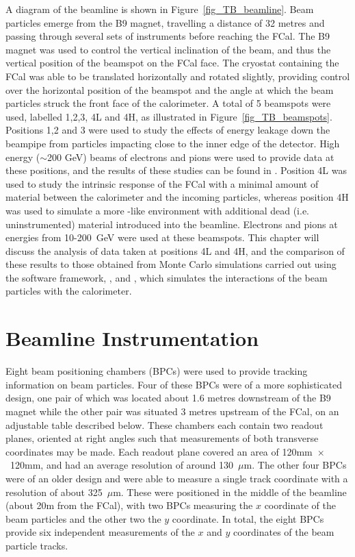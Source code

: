A diagram of the beamline is shown in Figure~\ref{fig_TB_beamline}. Beam particles emerge from the B9 magnet, travelling a distance of 32 metres and passing through several sets of instruments before reaching the FCal. The B9 magnet was used to control the vertical inclination of the beam, and thus the vertical position of the beamspot on the FCal face. The cryostat containing the FCal was able to be translated horizontally and rotated slightly, providing control over the horizontal position of the beamspot and the angle at which the beam particles struck the front face of the calorimeter. A total of 5 beamspots were used, labelled 1,2,3, 4L and 4H, as illustrated in Figure~\ref{fig_TB_beamspots}. Positions 1,2 and 3 were used to study the effects of energy leakage down the beampipe from particles impacting close to the inner edge of the detector. High energy ($\sim$200 GeV) beams of electrons and pions were used to provide data at these positions, and the results of these studies can be found in \cite{LouiseThesis,TB03_tbp}. Position 4L was used to study the intrinsic response of the FCal with a minimal amount of material between the calorimeter and the incoming particles, whereas position 4H was used to simulate a more \atlas-like environment with additional dead (i.e. uninstrumented) material introduced into the beamline. Electrons and pions at energies from 10-200~GeV were used at these beamspots. This chapter will discuss the analysis of data taken at positions 4L and 4H, and the comparison of these results to those obtained from Monte Carlo simulations carried out using the \atlas software framework, \athena, and \geant, which simulates the interactions of the beam particles with the calorimeter.
 



\section{Beamline Instrumentation}
\label{sec_TBoverview_beamline}
Eight beam positioning chambers (BPCs) were used to provide tracking information on beam particles.
Four of these BPCs were of a more sophisticated design, one pair of which was located about 1.6 metres downstream of the B9 magnet while the other pair was situated 3 metres upstream of the FCal, on an adjustable table described below. These chambers each contain two readout planes, oriented at right angles such that measurements of both transverse coordinates may be made. Each readout plane covered an area of 120mm~$\times$~120mm, and had an average resolution of around 130~$\mu$m. The other four BPCs were of an older design and were able to measure a single track coordinate with a resolution of about 325~$\mu$m. These were positioned in the middle of the beamline (about 20m from the FCal), with two BPCs measuring the $x$ coordinate of the beam particles and the other two the $y$ coordinate. In total, the eight BPCs provide six independent measurements of the $x$ and $y$ coordinates of the beam particle tracks.

